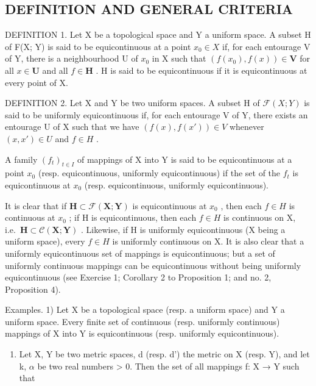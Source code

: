 \subsection{DEFINITION AND GENERAL CRITERIA}

DEFINITION 1. Let X be a topological space and Y a uniform space. A subset H of F(X; Y) is said to be equicontinuous at a point \(x_{0} \in X\) if, for each entourage V of Y, there is a neighbourhood U of \(x_{0}\) in X such that \((f(x_{0}),f(x))\in\mathbf{V}\) for all \(x\in\mathbf{U}\) and all \(f\in\mathbf{H}\) . H is said to be equicontinuous if it is equicontinuous at every point of X.

DEFINITION 2. Let X and Y be two uniform spaces. A subset H of \(\mathcal{F}(X;Y)\) is said to be uniformly equicontinuous if, for each entourage V of Y, there exists an entourage U of X such that we have \((f(x), f(x')) \in V\) whenever \((x, x') \in U\) and \(f \in H\) .

A family \((f_{t})_{t\in I}\) of mappings of X into Y is said to be equicontinuous at a point \(x_0\) (resp. equicontinuous, uniformly equicontinuous) if the set of the \(f_{t}\) is equicontinuous at \(x_0\) (resp. equicontinuous, uniformly equicontinuous).

It is clear that if \(\mathbf{H}\subset\mathcal{F}(\mathbf{X};\mathbf{Y})\) is equicontinuous at \(x_{0}\) , then each \(f\in H\) is continuous at \(x_{0}\) ; if H is equicontinuous, then each \(f\in H\) is continuous on X, i.e.~\(\mathbf{H}\subset\mathcal{C}(\mathbf{X};\mathbf{Y})\) . Likewise, if H is uniformly equicontinuous (X being a uniform space), every \(f\in H\) is uniformly continuous on X. It is also clear that a uniformly equicontinuous set of mappings is equicontinuous; but a set of uniformly continuous mappings can be equicontinuous without being uniformly equicontinuous (see Exercise 1; Corollary 2 to Proposition 1; and no. 2, Proposition 4).

Examples. 1) Let X be a topological space (resp. a uniform space) and Y a uniform space. Every finite set of continuous (resp. uniformly continuous) mappings of X into Y is equicontinuous (resp. uniformly equicontinuous).

\begin{enumerate}
\def\labelenumi{\arabic{enumi})}
\setcounter{enumi}{1}
\tightlist
\item
  Let X, Y be two metric spaces, d (resp. d') the metric on X (resp. Y), and let k, \(\alpha\) be two real numbers \textgreater{} 0. Then the set of all mappings f: X → Y such that
\end{enumerate}

